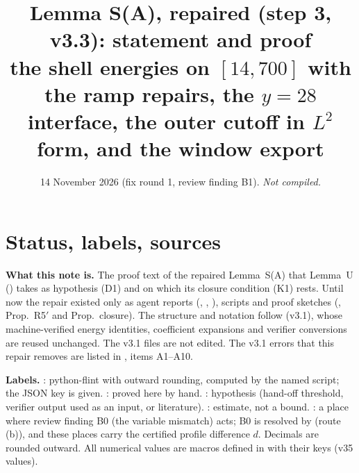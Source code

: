 \documentclass[11pt]{article}
\title{Lemma S(A), repaired (step 3, v3.3): statement and proof\\[2pt]\large the shell energies on $[14,700]$ with the ramp repairs, the $y=28$ interface, the outer cutoff in $L^2$ form, and the window export}
\author{}\date{14 November 2026 (fix round 1, review finding B1). \emph{Not compiled.}}
\begin{document}
\maketitle
\tableofcontents
\fi

\section{Status, labels, sources}\label{A:sec:status}
\noindent\textbf{What this note is.} The proof text of the repaired Lemma~S(A) that Lemma~U () takes as hypothesis (D1) and on which its closure condition (K1) rests. Until now the repair existed only as agent reports (, , ), scripts and proof sketches (, Prop.~R5$'$ and Prop.~closure). The structure and notation follow  (v3.1), whose machine-verified energy identities, coefficient expansions and verifier conversions are reused unchanged. The v3.1 files are not edited. The v3.1 errors that this repair removes are listed in , items A1--A10.

\noindent\textbf{Labels.} \tC: python-flint  with outward rounding, computed by the named script; the JSON key is given. \tP: proved here by hand. \tH: hypothesis (hand-off threshold, verifier output used as an input, or literature). \tE: estimate, not a bound. \tB: a place where review finding B0 (the variable mismatch) acts; B0 is resolved by  (route (b)), and these places carry the certified profile difference $d$. Decimals are rounded outward. All numerical values are macros defined in  with their keys (v35 values).
\end{document}
